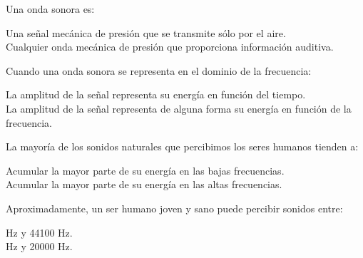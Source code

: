 \documentclass[legalpaper, 12pt, addpoints]{exam}
\begin{document}
\begin{questions}


  
\vspace{0.10in}

\question Una onda sonora es:

\begin{oneparchoices}
  \choice Una señal mecánica de presión que se transmite sólo por el aire.\\
  \choice Cualquier onda mecánica de presión que proporciona información auditiva.
\end{oneparchoices}
  
\question Cuando una onda sonora se representa en el dominio de la frecuencia:

\begin{oneparchoices}
  \choice La amplitud de la señal representa su energía en función del tiempo.\\
  \choice La amplitud de la señal representa de alguna forma su
  energía en función de la frecuencia.
\end{oneparchoices}
  
\vspace{0.10in}

\question La mayoría de los sonidos naturales que percibimos los seres humanos tienden a:

\begin{oneparchoices}
  \choice Acumular la mayor parte de su energía en las bajas frecuencias.\\
  \choice Acumular la mayor parte de su energía en las altas frecuencias.
\end{oneparchoices}
  
\vspace{0.10in}

\question Aproximadamente, un ser humano joven y sano puede percibir sonidos entre:

\begin{oneparchoices}
   Hz y 44100 Hz.\\
   Hz y 20000 Hz.
\end{oneparchoices}
  

\end{questions}
\end{document}
